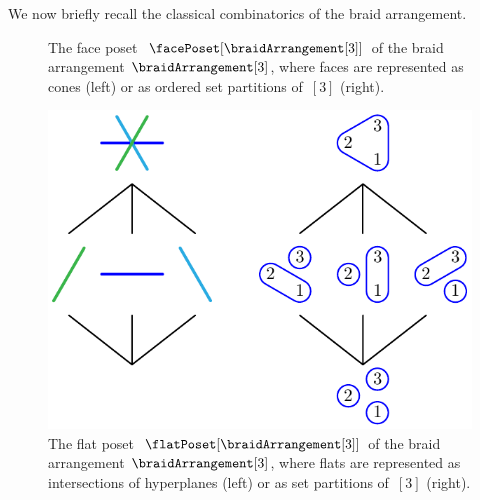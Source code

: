 \documentclass{amsart}
\newcommand{\vincent}[1]{\todo[color=blue!30]{\rm #1 \\ \hfill --- V.}}
\theoremstyle{definition}
\begin{document}
We now briefly recall the classical combinatorics of the braid arrangement.
\vincent{add refs?}


\begin{figure}
	\caption{The face poset~$\facePoset[{\braidArrangement[3]}]$ of the braid arrangement $\braidArrangement[3]$, where faces are represented as cones (left) or as ordered set partitions of~$[3]$ (right).}
	\label{fig:facePosetBraidArrangement3}
\end{figure}

\begin{figure}
	\centerline{\includegraphics[scale=.9]{figures/intersectionPosetBraidArrangement3}}
	\caption{The flat poset~$\flatPoset[{\braidArrangement[3]}]$ of the braid arrangement $\braidArrangement[3]$, where flats are represented as intersections of hyperplanes (left) or as set partitions of~$[3]$ (right).}
	\label{fig:intersectionPosetBraidArrangement3}
\end{figure}
\end{document}
